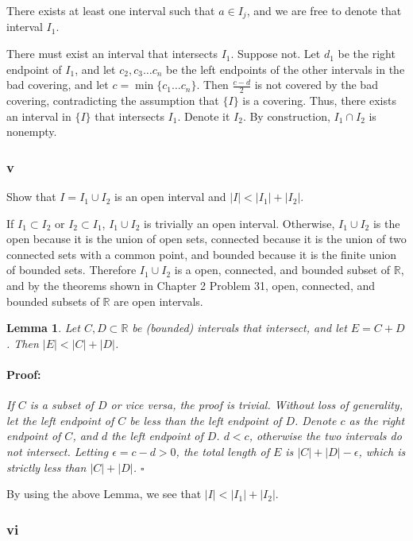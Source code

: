 \documentclass{article}
\newenvironment{proof}{\paragraph{Proof:}}{\hfill$\square$}
\newtheorem{lemma}[theorem]{Lemma}
\newcommand{\R}{\mathbb{R}}
\begin{document}
There exists at least one interval such that $a \in I_j$, and we are free to denote that interval $I_1$.

There must exist an interval that intersects $I_1$. Suppose not. Let $d_1$ be the right endpoint of $I_1$, and let $c_2, c_3 \dots c_n$ be the left endpoints of the other intervals in the bad covering, and let $c = \min\{c_1 \dots c_n\}$. Then $\frac{c-d}{2}$ is not covered by the bad covering, contradicting the assumption that $\{I\}$ is a covering. Thus, there exists an interval in $\{I\}$ that intersects $I_1$. Denote it $I_2$. By construction, $I_1 \cap I_2$ is nonempty.

\subsubsection*{v}

Show that $I = I_1 \cup I_2$ is an open interval and $|I| < |I_1| + |I_2|$.

If $I_1 \subset I_2$ or $I_2 \subset I_1$, $I_1 \cup I_2$ is trivially an open interval. Otherwise, $I_1 \cup I_2$ is the open because it is the union of open sets, connected because it is the union of two connected sets with a common point, and bounded because it is the finite union of bounded sets. Therefore $I_1 \cup I_2$ is a open, connected, and bounded subset of $\R$, and by the theorems shown in Chapter 2 Problem 31, open, connected, and bounded subsets of $\R$ are open intervals.

\begin{lemma}
Let $C, D \subset \R$ be (bounded) intervals that intersect, and let $E = C + D$. Then $|E| < |C| + |D|$.

\begin{proof}
If $C$ is a subset of $D$ or vice versa, the proof is trivial. Without loss of generality, let the left endpoint of $C$ be less than the left endpoint of $D$. Denote $c$ as the right endpoint of $C$, and $d$ the left endpoint of $D$. $d < c$, otherwise the two intervals do not intersect. Letting $\epsilon = c - d > 0$, the total length of $E$ is $|C| + |D| - \epsilon$, which is strictly less than $|C| + |D|$.
\end{proof}
\end{lemma}

By using the above Lemma, we see that $|I| < |I_1| + |I_2|$.

\subsubsection*{vi}
\end{document}
